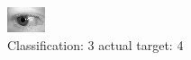 \begin{figure}[h!]
\begin{center}
\includegraphics[width=0.60\columnwidth]{figures/ID707_class_3_target_4.png}
\end{center}
\caption{ Classification: 3 actual target: 4}
\label{fig:ID707_class_3_target_4}
\end{figure}
